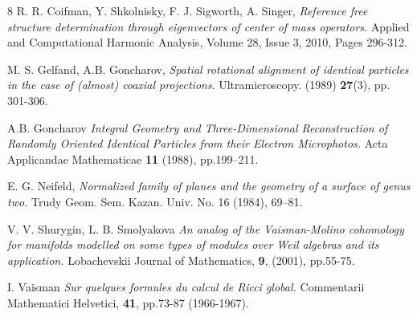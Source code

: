 \documentclass[runningheads]{llncs}
\begin{document}
{\small \begin{thebibliography}{8}
 R. R. Coifman, Y. Shkolnisky, F. J. Sigworth, A. Singer,
{\sl Reference free structure determination through eigenvectors of center of mass operators}.
Applied and Computational Harmonic Analysis,
Volume 28, Issue 3, 2010, Pages 296-312.

 M. S. Gelfand, A.B. Goncharov, {\sl Spatial rotational alignment of identical particles in the case of (almost) coaxial projections}. Ultramicroscopy. (1989) {\bf 27}(3), pp. 301-306.

 A.B. Goncharov  {\sl Integral Geometry and Three-Dimensional
Reconstruction of Randomly Oriented Identical Particles from their Electron Microphotos.} Acta Applicandae Mathematicae {\bf 11} (1988), pp.199--211. 

  E. G. Neifeld, {\sl Normalized family of planes and the geometry of a surface of genus two.}
Trudy Geom. Sem. Kazan. Univ. No. 16 (1984), 69–81.

  V. V. Shurygin, L. B. Smolyakova {\sl An analog of the Vaisman-Molino cohomology for manifolds modelled on some types of modules over Weil algebras and its application.} Lobachevskii Journal of Mathematics, {\bf 9},  (2001), pp.55-75. 

  I. Vaisman {\sl Sur quelques formules du calcul de Ricci global.} Commentarii Mathematici Helvetici, {\bf 41}, pp.73-87 (1966-1967). 
\end{thebibliography}}
\end{document}
